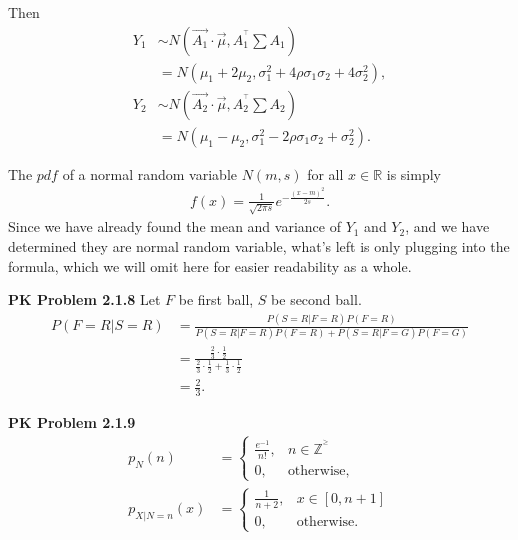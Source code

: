 \documentclass{article}
\begin{document}
Then 
\begin{align}
    Y_1 & \sim N(\vec{A_1}\cdot\vec{\mu}, A_1^{^\top}\sum A_1) \nonumber \\
    & = N(\mu_1+2\mu_2, \sigma_1^2+4\rho\sigma_1\sigma_2+4\sigma_2^2), \nonumber \\
    Y_2 & \sim N(\vec{A_2}\cdot\vec{\mu}, A_2^{^\top}\sum A_2) \nonumber \\
    & = N(\mu_1-\mu_2,\sigma_1^2-2\rho\sigma_1\sigma_2+\sigma_2^2). \nonumber
\end{align}

The $pdf$ of a normal random variable $N(m,s)$ for all $x \in \mathbb{R}$ is simply 
\begin{align}
    f(x) = \frac{1}{\sqrt{2\pi s}}e^{-\frac{(x-m)^2}{2s}}. \nonumber
\end{align}
Since we have already found the mean and variance of $Y_1$ and $Y_2$, and we have determined they are normal random variable, what's left is only plugging into the formula, which we will omit here for easier readability as a whole.
\bigbreak

\textbf{PK Problem 2.1.8} 
Let $F$ be first ball, $S$ be second ball.
\begin{align}
    P(F = R | S = R) & = \frac{P(S = R | F = R)P(F = R)}{P(S = R | F = R)P(F = R) + P(S = R | F = G)P(F = G)} \nonumber \\
    & = \frac{\frac{2}{3}\cdot\frac{1}{2}}{\frac{2}{3}\cdot\frac{1}{2} + \frac{1}{3}\cdot\frac{1}{2}} \nonumber \\
    & = \frac{2}{3}. \nonumber
\end{align}
\bigbreak

\textbf{PK Problem 2.1.9} 
\begin{align}
    p_N(n) & = \begin{cases}
        \frac{e^{-1}}{n!}, & n \in \mathbb{Z^{^\ge}}\nonumber \\
        0, & \text{otherwise}, \nonumber
    \end{cases} \\
    p_{X|N=n}(x) & = \begin{cases}
        \frac{1}{n+2}, & x \in [0,n+1] \nonumber \\
        0, & \text{otherwise}. \nonumber
    \end{cases}
\end{align}
\end{document}
